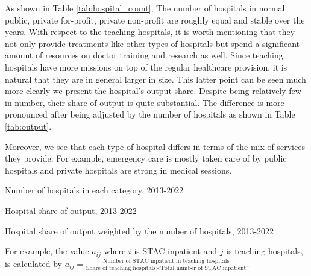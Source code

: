 \documentclass[12pt]{article}
\begin{document}
As shown in Table \ref{tab:hospital_count}, The number of hospitals in normal
public, private for-profit, private non-profit are roughly equal and stable
over the years. With respect to the teaching hospitals, it is worth mentioning
that they not only provide treatments like other types of hospitals but spend a
significant amount of resources on doctor training and research as well. Since
teaching hospitals have more missions on top of the regular healthcare
provision, it is natural that they are in general larger in size. This latter
point can be seen much more clearly we present the hospital's output share.
Despite being relatively few in number, their share of output is quite
substantial. The difference is more pronounced after being adjusted by the
number of hospitals as shown in Table \ref{tab:output}.

Moreover, we see that each type of hospital differs in terms of the mix of
services they provide. For example, emergency care is mostly taken care of by
public hospitals and private hospitals are strong in medical sessions.

\begin{table}
    \centering
    
    \caption{Number of hospitals in each category, 2013-2022}
    \label{tab:hospital_count}
\end{table}

\begin{table}\fontsize{10pt}{12pt}\selectfont
    \centering
    \begin{threeparttable}[b]

        
        \caption{Hospital share of output, 2013-2022}
        \label{tab:nonadjusted}
    \end{threeparttable}
\end{table}

\begin{table}\fontsize{10pt}{12pt}\selectfont
    \centering
    \begin{threeparttable}[b]
        
        \caption{Hospital share of output weighted by the number of hospitals, 2013-2022}
        \label{tab:output}
        \begin{tablenotes}
            \footnotesize
            For example, the value $a_{ij}$ where $i$ is STAC inpatient and $j$ is teaching hospitals, is calculated by $a_{ij}= \frac{\text{Number of STAC inpatient  in teaching hospitals}}{\text{Share of teaching hospitals}\times \text{Total number of STAC inpatient}}$.
        \end{tablenotes}

    \end{threeparttable}
\end{table}
\end{document}
